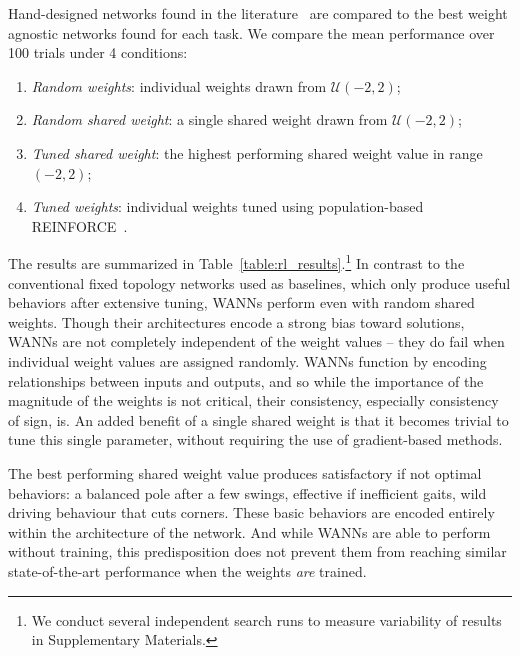 Hand-designed networks found in the literature~\cite{ha2018designrl,ha2018worldmodels} are compared to the best weight agnostic networks found for each task. We compare the mean performance over 100 trials under 4 conditions:
\begin{enumerate}
\item \textit{Random weights}: individual weights drawn from $\mathcal{U}(-2,2)$;
%
\item \textit{Random shared weight}: a single shared weight drawn from $\mathcal{U}(-2,2)$; 
% 
\item \textit{Tuned shared weight}: the highest performing shared weight value in range $(-2,2)$;
%
\item \textit{Tuned weights}: individual weights tuned using population-based REINFORCE~\cite{williams1992simple}.
\end{enumerate}



The results are summarized in Table~\ref{table:rl_results}.\footnote{We conduct several independent search runs to measure variability of results in Supplementary Materials.}
%
In contrast to the conventional fixed topology networks used as baselines, which only produce useful behaviors after extensive tuning, WANNs perform even with random shared weights.
%
Though their architectures encode a strong bias toward solutions, WANNs are not completely independent of the weight values -- they do fail when individual weight values are assigned randomly.
%
WANNs function by encoding relationships between inputs and outputs, and so while the importance of the magnitude of the weights is not critical, their consistency, especially consistency of sign, is. An added benefit of a single shared weight is that it becomes trivial to tune this single parameter, without requiring the use of gradient-based methods.

The best performing shared weight value produces satisfactory if not optimal behaviors: a balanced pole after a few swings, effective if inefficient gaits, wild driving behaviour that cuts corners. 
%
These basic behaviors are encoded entirely within the architecture of the network. 
%
And while WANNs are able to perform without training, this predisposition does not prevent them from reaching similar state-of-the-art performance when the weights \textit{are} trained. 



